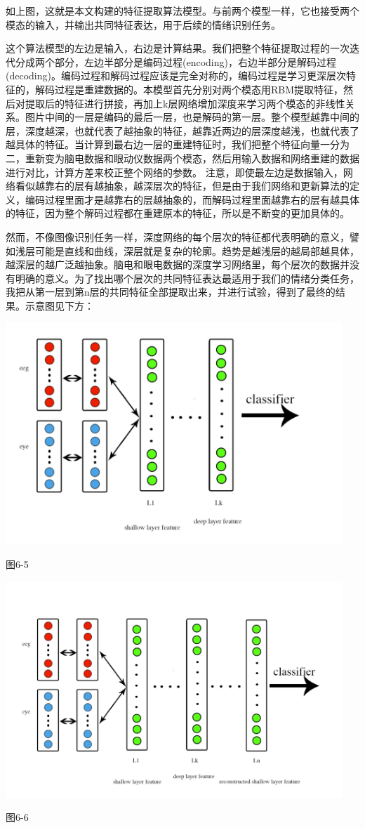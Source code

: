		如上图，这就是本文构建的特征提取算法模型。与前两个模型一样，它也接受两个模态的输入，并输出共同特征表达，用于后续的情绪识别任务。
		
		这个算法模型的左边是输入，右边是计算结果。我们把整个特征提取过程的一次迭代分成两个部分，左边半部分是编码过程(encoding)，右边半部分是解码过程(decoding)。编码过程和解码过程应该是完全对称的，编码过程是学习更深层次特征的，解码过程是重建数据的。本模型首先分别对两个模态用RBM提取特征，然后对提取后的特征进行拼接，再加上k层网络增加深度来学习两个模态的非线性关系。图片中间的一层是编码的最后一层，也是解码的第一层。整个模型越靠中间的层，深度越深，也就代表了越抽象的特征，越靠近两边的层深度越浅，也就代表了越具体的特征。当计算到最右边一层的重建特征时，我们把整个特征向量一分为二，重新变为脑电数据和眼动仪数据两个模态，然后用输入数据和网络重建的数据进行对比，计算方差来校正整个网络的参数。 注意，即使最左边是数据输入，网络看似越靠右的层有越抽象，越深层次的特征，但是由于我们网络和更新算法的定义，编码过程里面才是越靠右的层越抽象的，而解码过程里面越靠右的层有越具体的特征，因为整个解码过程都在重建原本的特征，所以是不断变的更加具体的。
		
		然而，不像图像识别任务一样，深度网络的每个层次的特征都代表明确的意义，譬如浅层可能是直线和曲线，深层就是复杂的轮廓。趋势是越浅层的越局部越具体，越深层的越广泛越抽象。脑电和眼电数据的深度学习网络里，每个层次的数据并没有明确的意义。为了找出哪个层次的共同特征表达最适用于我们的情绪分类任务，我把从第一层到第n层的共同特征全部提取出来，并进行试验，得到了最终的结果。示意图见下方：
		\centerline{\includegraphics[width=5in]{figure/classifyk.png}}
		\centerline{图6-5}
		\centerline{\includegraphics[width=5in]{figure/classifyn.png}}
		\centerline{图6-6}
		
